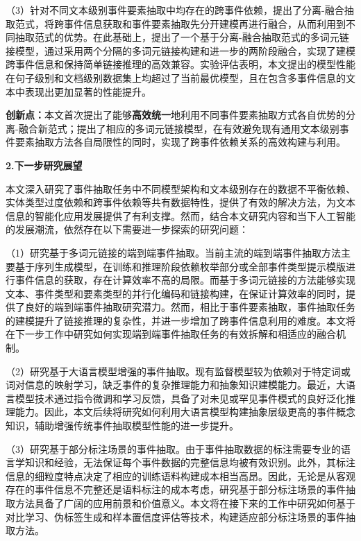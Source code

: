\begin{conclusion}
（3）针对不同文本级别事件要素抽取中均存在的跨事件依赖，提出了分离-融合抽取范式，将跨事件信息获取和事件要素抽取先分开建模再进行融合，从而利用到不同抽取范式的优势。在此基础上，提出了一个基于分离-融合抽取范式的多词元链接模型，通过采用两个分隔的多词元链接构建和进一步的两阶段融合，实现了建模跨事件信息和保持简单链接推理的高效兼容。实验评估表明，本文提出的模型性能在句子级别和文档级别数据集上均超过了当前最优模型，且在包含多事件信息的文本中表现出更加显著的性能提升。

\textbf{创新点：}本文首次提出了能够\textbf{高效统一}地利用不同事件要素抽取方式各自优势的分离-融合新范式；提出了相应的多词元链接模型，在有效避免现有通用文本级别事件要素抽取方法各自局限性的同时，实现了跨事件依赖关系的高效构建与利用。

\textbf{2.下一步研究展望}

本文深入研究了事件抽取任务中不同模型架构和文本级别存在的数据不平衡依赖、实体类型过度依赖和跨事件依赖等共有数据特性，提供了有效的解决方法，为文本信息的智能化应用发展提供了有利支撑。然而，结合本文研究内容和当下人工智能的发展潮流，依然存在以下需要进一步探索的研究问题：

（1）研究基于多词元链接的端到端事件抽取。当前主流的端到端事件抽取方法主要基于序列生成模型，在训练和推理阶段依赖枚举部分或全部事件类型提示模版进行事件信息的获取，存在计算效率不高的局限。而基于多词元链接的方法能够实现文本、事件类型和要素类型的并行化编码和链接构建，在保证计算效率的同时，提供了良好的端到端事件抽取研究潜力。然而，相比于事件要素抽取，事件抽取任务的建模提升了链接推理的复杂性，并进一步增加了跨事件信息利用的难度。本文将在下一步工作中研究如何实现端到端事件抽取任务的有效拆解和相适应的融合机制。

（2）研究基于大语言模型增强的事件抽取。现有监督模型较为依赖对于特定词或词对信息的映射学习，缺乏事件的复杂推理能力和抽象知识建模能力。最近，大语言模型技术通过指令微调和学习反馈，具备了对未见或罕见事件模式的良好泛化推理能力。因此，本文后续将研究如何利用大语言模型构建抽象层级更高的事件概念知识，辅助增强传统事件抽取模型性能的进一步提升。

（3）研究基于部分标注场景的事件抽取。由于事件抽取数据的标注需要专业的语言学知识和经验，无法保证每个事件数据的完整信息均被有效识别。此外，其标注信息的细粒度特点决定了相应的训练语料构建成本相当高昂。因此，无论是从客观存在的事件信息不完整还是语料标注的成本考虑，研究基于部分标注场景的事件抽取方法具备了广阔的应用前景和价值意义。本文将在接下来的工作中研究如何基于对比学习、伪标签生成和样本置信度评估等技术，构建适应部分标注场景的事件抽取方法。

\end{conclusion}